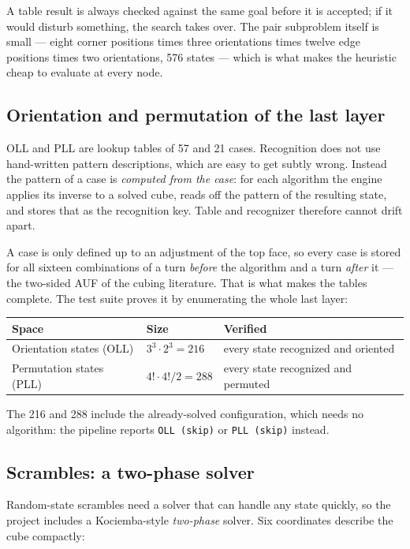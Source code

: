 A table result is always checked against the same goal before it is accepted; if it
would disturb something, the search takes over.  The pair subproblem itself is
small --- eight corner positions times three orientations times twelve edge
positions times two orientations, 576 states --- which is what makes the heuristic
cheap to evaluate at every node.

\subsection{Orientation and permutation of the last layer}

OLL and PLL are lookup tables of 57 and 21 cases.  Recognition does not use
hand-written pattern descriptions, which are easy to get subtly wrong.  Instead the
pattern of a case is \emph{computed from the case}: for each algorithm the engine
applies its inverse to a solved cube, reads off the pattern of the resulting state,
and stores that as the recognition key.  Table and recognizer therefore cannot
drift apart.

A case is only defined up to an adjustment of the top face, so every case is stored
for all sixteen combinations of a turn \emph{before} the algorithm and a turn
\emph{after} it --- the two-sided AUF of the cubing literature.  That is what makes
the tables complete.  The test suite proves it by enumerating the whole last layer:

\begin{center}
\begin{tabular}{@{}lll@{}}
\toprule
Space & Size & Verified \\
\midrule
Orientation states (OLL) & $3^3 \cdot 2^3 = 216$ & every state recognized and oriented \\
Permutation states (PLL) & $4! \cdot 4! / 2 = 288$ & every state recognized and permuted \\
\bottomrule
\end{tabular}
\end{center}

The 216 and 288 include the already-solved configuration, which needs no algorithm:
the pipeline reports \texttt{OLL (skip)} or \texttt{PLL (skip)} instead.

\subsection{Scrambles: a two-phase solver}

Random-state scrambles need a solver that can handle any state quickly, so the
project includes a Kociemba-style \emph{two-phase} solver.  Six coordinates describe
the cube compactly:

